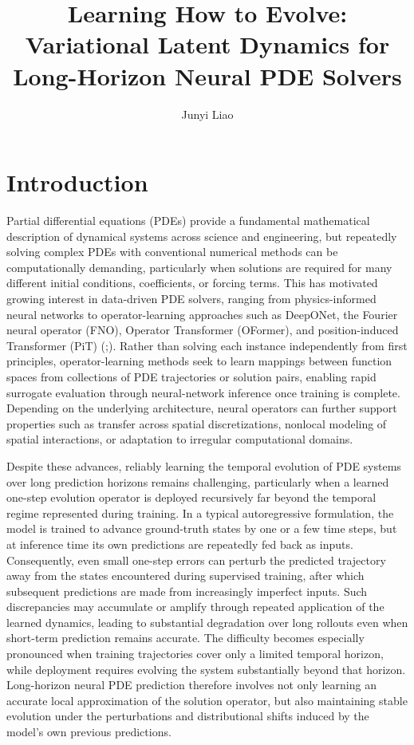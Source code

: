 \documentclass[11pt]{article}
\title{\bf Learning How to Evolve: Variational Latent Dynamics for Long-Horizon Neural PDE Solvers}
\author{Junyi Liao}
\date{}
\begin{document}
\maketitle

\section{Introduction}
Partial differential equations (PDEs) provide a fundamental mathematical description of dynamical systems across science and engineering, but repeatedly solving complex PDEs with conventional numerical methods can be computationally demanding, particularly when solutions are required for many different initial conditions, coefficients, or forcing terms. This has motivated growing interest in data-driven PDE solvers, ranging from physics-informed neural networks to operator-learning approaches such as DeepONet, the Fourier neural operator (FNO), Operator Transformer (OFormer), and position-induced Transformer (PiT) (\citealp{raissi2019physics,lu2021learning,li2020fourier};\citealp{li2022transformer,chen2024positional}). Rather than solving each instance independently from first principles, operator-learning methods seek to learn mappings between function spaces from collections of PDE trajectories or solution pairs, enabling rapid surrogate evaluation through neural-network inference once training is complete. Depending on the underlying architecture, neural operators can further support properties such as transfer across spatial discretizations, nonlocal modeling of spatial interactions, or adaptation to irregular computational domains.

Despite these advances, reliably learning the temporal evolution of PDE systems over long prediction horizons remains challenging, particularly when a learned one-step evolution operator is deployed recursively far beyond the temporal regime represented during training. In a typical autoregressive formulation, the model is trained to advance ground-truth states by one or a few time steps, but at inference time its own predictions are repeatedly fed back as inputs. Consequently, even small one-step errors can perturb the predicted trajectory away from the states encountered during supervised training, after which subsequent predictions are made from increasingly imperfect inputs. Such discrepancies may accumulate or amplify through repeated application of the learned dynamics, leading to substantial degradation over long rollouts even when short-term prediction remains accurate. The difficulty becomes especially pronounced when training trajectories cover only a limited temporal horizon, while deployment requires evolving the system substantially beyond that horizon. Long-horizon neural PDE prediction therefore involves not only learning an accurate local approximation of the solution operator, but also maintaining stable evolution under the perturbations and distributional shifts induced by the model's own previous predictions.
\end{document}
